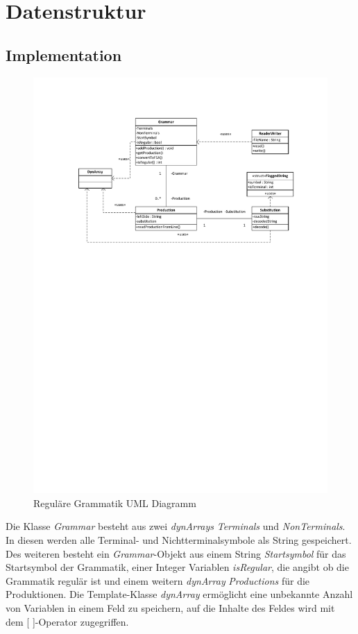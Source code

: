 \section{Datenstruktur}

\subsection{Implementation}

\begin{figure}[h]
  \begin{center}
  \includegraphics[scale=0.95]{objectsToInclude/UMLGrammar.pdf}
  \caption{Reguläre Grammatik UML Diagramm}
  \label{fig:UMLRegGrammar}
  \end{center}
\end{figure}

Die Klasse \textit{Grammar} besteht aus zwei \textit{dynArrays}
\textit{Terminals} und \textit{NonTerminals}. In diesen werden alle Terminal- und Nichtterminalsymbole
als String gespeichert. Des weiteren besteht ein \textit{Grammar}-Objekt aus
einem String \textit{Startsymbol} für das Startsymbol
der Grammatik, einer Integer Variablen \textit{isRegular}, die angibt ob die Grammatik
regulär ist und einem weitern \textit{dynArray} \textit{Productions} für die
Produktionen. Die Template-Klasse \textit{dynArray} ermöglicht eine unbekannte
Anzahl von Variablen in einem Feld zu speichern, auf die Inhalte des Feldes
wird mit dem [ ]-Operator zugegriffen.

